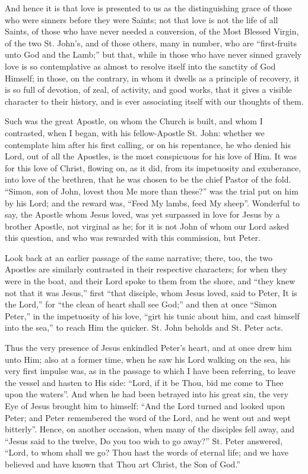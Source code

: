 And hence it is that love is presented to us as the distinguishing
grace of those who were sinners before they were Saints; not that love
is not the life of all Saints, of those who have never needed a
conversion, of the Most Blessed Virgin, of the two St. John's, and of
those others, many in number, who are ``first-fruits unto God and
the Lamb;'' but that, while in those who have never sinned gravely
love is so contemplative as almost to resolve itself into the sanctity
of God Himself; in those, on the contrary, in whom it dwells as a
principle of recovery, it is so full of devotion, of zeal, of
activity, and good works, that it gives a visible character to their
history, and is ever associating itself with our thoughts of them.

Such was the great Apostle, on whom the Church is built, and whom I
contrasted, when I began, with his fellow-Apostle St. John: whether we
contemplate him after his first calling, or on his repentance, he who
denied his Lord, out of all the Apostles, is the most conspicuous for
his love of Him. It was for this love of Christ, flowing on, as it
did, from its impetuosity and exuberance, into love of the brethren,
that he was chosen to be the chief Pastor of the fold. ``Simon,
son of John, lovest thou Me more than these?'' was the trial put
on him by his Lord; and the reward was, ``Feed My lambs, feed My
sheep''. Wonderful to say, the Apostle whom Jesus loved, was yet
surpassed in love for Jesus by a brother Apostle, not virginal as he;
for it is not John of whom our Lord asked this question, and who was
rewarded with this commission, but Peter.

Look back at an earlier passage of the same narrative; there, too,
the two Apostles are similarly contrasted in their respective
characters; for when they were in the boat, and their Lord spoke to
them from the shore, and ``they knew not that it was Jesus,''
first ``that disciple, whom Jesus loved, said to Peter, It is the
Lord,'' for ``the clean of heart shall see God;'' and then
at once ``Simon Peter,'' in the impetuosity of his love,
``girt his tunic about him, and cast himself into the sea,''
to reach Him the quicker. St. John beholds and St. Peter acts.

Thus the very presence of Jesus enkindled Peter's heart, and at
once drew him unto Him; also at a former time, when he saw his Lord
walking on the sea, his very first impulse was, as in the passage to
which I have been referring, to leave the vessel and hasten to His
side: ``Lord, if it be Thou, bid me come to Thee upon the
waters''. And when he had been betrayed into his great sin, the
very Eye of Jesus brought him to himself: ``And the Lord turned
and looked upon Peter; and Peter remembered the word of the Lord, and
he went out and wept bitterly''. Hence, on another occasion, when
many of the disciples fell away, and ``Jesus said to the twelve,
Do you too wish to go away?'' St. Peter answered, ``Lord, to
whom shall we go? Thou hast the words of eternal life; and we have
believed and have known that Thou art Christ, the Son of God.''

